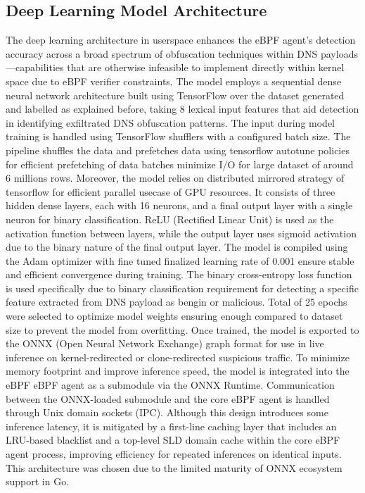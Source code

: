 \documentclass [11pt, proquest] {uwthesis}[2020/02/24]
\begin{document}
\subsection{Deep Learning Model Architecture}
\label{sec:ml}
The deep learning architecture in userspace enhances the eBPF agent’s detection accuracy across a broad spectrum of obfuscation techniques within DNS payloads—capabilities that are otherwise infeasible to implement directly within kernel space due to eBPF verifier constraints. The model employs a sequential dense neural network architecture  built using TensorFlow over the dataset generated and labelled as explained before, taking 8 lexical input features that aid detection in identifying exfiltrated DNS obfuscation patterns. The input during model training is handled using TensorFlow shufflers with a configured batch size. The pipeline shuffles the data and prefetches data using tensorflow autotune policies for efficient prefetching of data batches minimize I/O for large dataset of around 6 millions rows. Moreover, the model relies on distributed mirrored strategy of tensorflow for efficient parallel usecase of GPU resources.
It consists of three hidden dense layers, each with 16 neurons, and a final output layer with a single neuron for binary classification. ReLU (Rectified Linear Unit) is used as the activation function between layers, while the output layer uses sigmoid activation due to the binary nature of the final output layer. The model is compiled using the Adam optimizer with fine tuned finalized learning rate of 0.001 ensure stable and efficient convergence during training. The binary cross-entropy loss function is used specifically due to binary classification requirement for detecting a specific feature extracted from DNS payload as bengin or malicious. Total of 25 epochs were selected to optimize model weights ensuring enough compared to dataset size to prevent the model from overfitting. 
Once trained, the model is exported to the ONNX (Open Neural Network Exchange) graph format for use in live inference on kernel-redirected or clone-redirected suspicious traffic. To minimize memory footprint and improve inference speed, the model is integrated into the eBPF eBPF agent as a submodule via the ONNX Runtime. Communication between the ONNX-loaded submodule and the core eBPF agent is handled through Unix domain sockets (IPC). Although this design introduces some inference latency, it is mitigated by a first-line caching layer that includes an LRU-based blacklist and a top-level SLD domain cache within the core eBPF agent process, improving efficiency for repeated inferences on identical inputs. This architecture was chosen due to the limited maturity of ONNX ecosystem support in Go.
\end{document}
